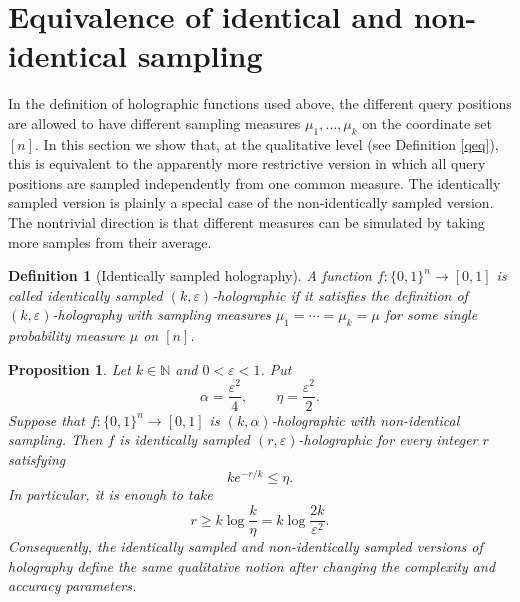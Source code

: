 \documentclass[11pt]{amsart}
\newtheorem{proposition}[theorem]{Proposition}
\newtheorem{definition}[theorem]{Definition}
\newcommand{\1}{\mathbf 1}
\newcommand{\cube}{\{0,1\}}
\begin{document}
\section{Equivalence of identical and non-identical sampling}\label{sec:idvsnonid}

In the definition of holographic functions used above, the different
query positions are allowed to have different sampling measures $\mu_1,\ldots,\mu_k$ on the coordinate set \([n]\).  In this section we show that, at the qualitative
level (see Definition \ref{qeq}), this is equivalent to the apparently more restrictive version in which
all query positions are sampled independently from one common measure.
The identically sampled version is plainly a special case of the
non-identically sampled version.  The nontrivial direction is that different
measures can be simulated by taking more samples from their average.


\begin{definition}[Identically sampled holography]
A function \(f:\cube^n\to[0,1]\) is called \emph{identically sampled
\((k,\varepsilon)\)-holographic} if it satisfies the definition of
\((k,\varepsilon)\)-holography with sampling measures
\(\mu_1=\cdots=\mu_k=\mu\) for some single probability measure \(\mu\) on
\([n]\).
\end{definition}

\begin{proposition}\label{prop:identical-nonidentical-equivalence}
Let \(k\in\mathbb N\) and \(0<\varepsilon<1\).  Put
\[
        \alpha=\frac{\varepsilon^2}{4},
        \qquad
        \eta=\frac{\varepsilon^2}{2}.
\]
Suppose that \(f:\{0,1\}^n\to[0,1]\) is
\((k,\alpha)\)-holographic with non-identical sampling.  Then \(f\) is
identically sampled \((r,\varepsilon)\)-holographic for every integer
\(r\) satisfying
\[
        k e^{-r/k}\leq \eta .
\]
In particular, it is enough to take
\[
        r\geq k\log\frac{k}{\eta}
        =
        k\log\frac{2k}{\varepsilon^2}.
\]
Consequently, the identically sampled and non-identically sampled versions of
holography define the same qualitative notion after changing the complexity
and accuracy parameters.
\end{proposition}
\end{document}
